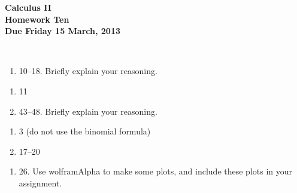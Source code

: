 \documentclass[12pt]{article}
\begin{document}
\pagestyle{empty}

\begin{center}
{\large {\bf Calculus II}}\\
\medskip
{\large {\bf Homework Ten}}\\
\medskip
{ {\bf Due Friday 15 March, 2013}}\\
\end{center}

\hspace{2mm}\\



%


\begin{enumerate}
\setlength{\itemsep}{-1mm}
\item 10--18.  Briefly explain your reasoning.
\end{enumerate}


\begin{enumerate}
\setlength{\itemsep}{-1mm}
  \item 11
  \item 43--48. Briefly explain your reasoning.
\end{enumerate}


%


\begin{enumerate}
\setlength{\itemsep}{-1mm}
  \item 3 (do not use the binomial formula)
  \item 17--20
\end{enumerate}



\begin{enumerate}
\setlength{\itemsep}{-1mm}
  \item 26.  Use wolframAlpha to make some plots, and include these
  plots in your assignment.
\end{enumerate}


%
\end{document}
